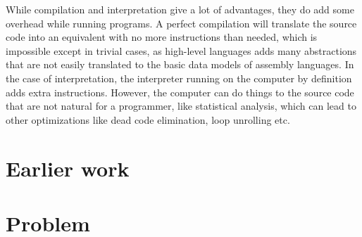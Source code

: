 While compilation and interpretation give a lot of advantages, they do add some overhead while running programs. A perfect compilation will translate the source code into an equivalent with no more instructions than needed, which is impossible except in trivial cases, as high-level languages adds many abstractions that are not easily translated to the basic data models of assembly languages. In the case of interpretation, the interpreter running on the computer by definition adds extra instructions. However, the computer can do things to the source code that are not natural for a programmer, like statistical analysis, which can lead to other optimizations like dead code elimination, loop unrolling etc.

\section{Earlier work}

\section{Problem}